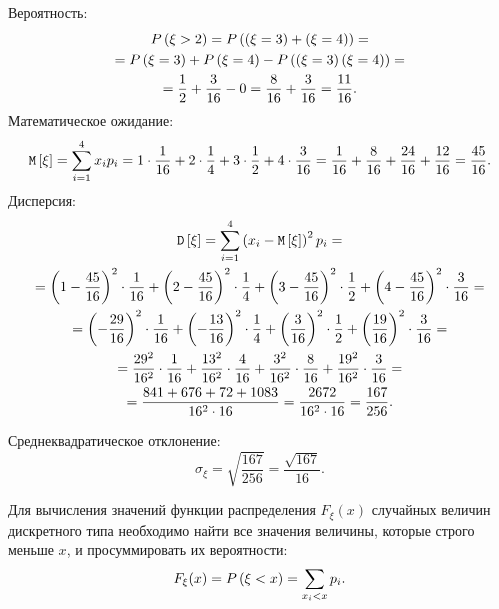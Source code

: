 Вероятность:
\begin{multline}
    P \left ( \xi > 2 \right )
    = P \left ( \left ( \xi = 3 \right ) + \left ( \xi = 4 \right ) \right ) = \\
    = P \left ( \xi = 3 \right ) + P \left ( \xi = 4 \right ) - P \left ( \left ( \xi = 3 \right ) \left ( \xi = 4 \right ) \right ) = \\
    = \frac{1}{2} + \frac{3}{16} - 0
    = \frac{8}{16} + \frac{3}{16}
    = \frac{11}{16} .
\end{multline}
Математическое ожидание:
\begin{equation}
    \mathtt{M} \left [ \xi \right ]
    = \sum_{i=1}^4 x_i p_i
    = 1 \cdot \frac{1}{16} + 2 \cdot \frac{1}{4} + 3 \cdot \frac{1}{2} + 4 \cdot \frac{3}{16}
    = \frac{1}{16} + \frac{8}{16} + \frac{24}{16} + \frac{12}{16}
    = \frac{45}{16} .
\end{equation}
Дисперсия:
\begin{multline}
    \mathtt{D} \left [ \xi \right ]
    = \sum_{i=1}^4 \left ( x_i - \mathtt{M} \left [ \xi \right ] \right )^2 p_i = \\
    = \left ( 1 - \frac{45}{16} \right )^2 \cdot \frac{1}{16} + \left ( 2 - \frac{45}{16} \right )^2 \cdot \frac{1}{4} + \left ( 3 - \frac{45}{16} \right )^2 \cdot \frac{1}{2} + \left ( 4 - \frac{45}{16} \right )^2 \cdot \frac{3}{16} = \\
    = \left ( - \frac{29}{16} \right )^2 \cdot \frac{1}{16} + \left ( - \frac{13}{16} \right )^2 \cdot \frac{1}{4} + \left ( \frac{3}{16} \right )^2 \cdot \frac{1}{2} + \left ( \frac{19}{16} \right )^2 \cdot \frac{3}{16} = \\
    = \frac{29^2}{16^2} \cdot \frac{1}{16} + \frac{13^2}{16^2} \cdot \frac{4}{16} + \frac{3^2}{16^2} \cdot \frac{8}{16} + \frac{19^2}{16^2} \cdot \frac{3}{16} = \\
    = \frac{841 + 676 + 72 + 1083}{16^2 \cdot 16}
    = \frac{2672}{16^2 \cdot 16}
    = \frac{167}{256} .
\end{multline}

Среднеквадратическое отклонение:
\begin{equation}
    \sigma_\xi
    = \sqrt{\frac{167}{256}}
    = \frac{\sqrt{167}}{16} .
\end{equation}

Для вычисления значений функции распределения $F_\xi(x)$ случайных величин дискретного типа необходимо найти все значения величины, которые строго меньше $x$, и просуммировать
их вероятности:
\begin{equation}
    F_\xi(x)
    = P \left ( \xi < x \right )
    = \sum_{x_i < x} p_i .
\end{equation}


